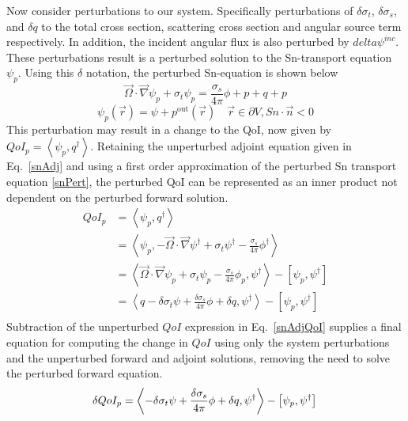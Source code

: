 \documentclass{article}
\newcommand{\vr}{\vec{r}}
\newcommand{\vO}{\vec{\Omega}}
\newcommand{\bra}{\left\langle}
\newcommand{\ket}{\right\rangle}
\newcommand{\sbra}{\left[}
\newcommand{\sket}{\right]}
\newcommand{\vgrad}{\vec{\nabla}}
\newcommand{\bound}{\partial V}
\newcommand{\sigt}{\sigma_t}
\newcommand{\sigs}{\sigma_s}
\newcommand{\scalSource}{q}
\newcommand{\angResp}{q^\dag}
\newcommand{\qoi}{QoI}
\begin{document}
Now consider perturbations to our system. Specifically perturbations of $\delta \sigt$, $\delta \sigs$, and $\delta q$ to the total cross section, scattering cross section and angular source term respectively. In addition, the incident angular flux is also perturbed by $delta \psi^{inc}$. These perturbations result is a perturbed solution to the Sn-transport equation $\psi_p$. Using this $\delta$ notation, the perturbed Sn-equation is shown below
\begin{equation}
\label{snFwdPert}
\vO \cdot \vgrad \psi_p + \sigt \psi_p = \frac{\sigs}{4 \pi} \phi+p + q+p
\end{equation}
\begin{equation}
\psi_p(\vr) = \psi+p^{\text{out}}(\vr) \quad \vr \in \bound , Sn \cdot \vec{n} < 0
\end{equation}
This perturbation may result in a change to the QoI, now given by $\qoi_p=\bra \psi_p , \angResp \ket$. Retaining the unperturbed adjoint equation given in Eq.~\eqref{snAdj} and using a first order approximation of the perturbed Sn transport equation \ref{snPert}, the perturbed QoI can be represented as an inner product not dependent on the perturbed forward solution.
\begin{equation}
\label{snSens}
\begin{split}
QoI_p &=\bra \psi_p , \angResp \ket \\
&=\bra \psi_p , - \vO \cdot \vgrad \psi^\dag + \sigt \psi^\dag - \frac{\sigs}{4 \pi} \phi^\dag  \ket \\
&= \bra  \vO \cdot \vgrad \psi_p + \sigt \psi_p - \frac{\sigs}{4 \pi} \phi_p , \psi^\dag  \ket - \sbra \psi_p, \psi^\dag \sket\\
&= \bra  \scalSource - \delta \sigt \psi + \frac{\delta\sigs}{4 \pi} \phi + \delta \scalSource , \psi^\dag  \ket - \sbra \psi_p, \psi^\dag \sket\\
\end{split}
\end{equation}
Subtraction of the unperturbed $QoI$ expression in Eq.~\eqref{snAdjQoI} supplies a final equation for computing the change in $QoI$ using only the system perturbations and the unperturbed forward and adjoint solutions, removing the need to solve the perturbed forward equation.
\begin{equation}
\delta QoI_p = \bra - \delta \sigt \psi + \frac{\delta\sigs}{4 \pi} \phi + \delta \scalSource , \psi^\dag  \ket - \sbra \psi_p, \psi^\dag \sket\\
\end{equation}
\end{document}
